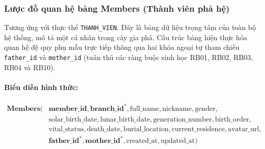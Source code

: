 \subsubsection{Lược đồ quan hệ bảng Members (Thành viên phả hệ)}
Tương ứng với thực thể \texttt{THANH\_VIEN}. Đây là bảng dữ liệu trọng tâm của toàn bộ hệ thống, mô tả một cá nhân trong cây gia phả. Cấu trúc bảng hiện thực hóa quan hệ đệ quy phụ mẫu trực tiếp thông qua hai khóa ngoại tự tham chiếu \texttt{father\_id} và \texttt{mother\_id} (tuân thủ các ràng buộc sinh học RB01, RB02, RB03, RB04 và RB10).

\paragraph{Biểu diễn hình thức:}
\[
\begin{aligned}
\textbf{Members}\big(
&\underline{\textbf{member\_id}}, \textbf{branch\_id}^*, \text{full\_name}, \text{nickname}, \text{gender}, \\
&\text{solar\_birth\_date}, \text{lunar\_birth\_date}, \text{generation\_number}, \text{birth\_order}, \\
&\text{vital\_status}, \text{death\_date}, \text{burial\_location}, \text{current\_residence}, \text{avatar\_url}, \\
&\textbf{father\_id}^*, \textbf{mother\_id}^*, \text{created\_at}, \text{updated\_at}
\big)
\end{aligned}
\]


